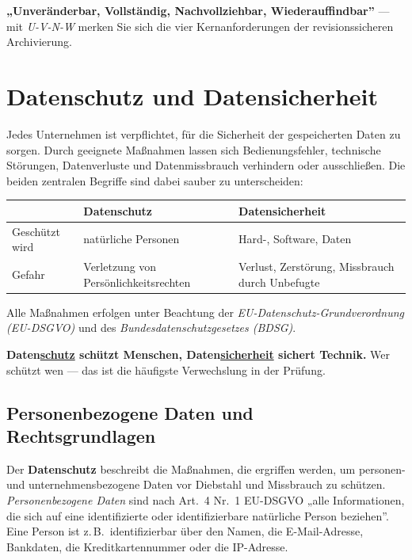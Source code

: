 \documentclass[11pt, a4paper]{article}
\begin{document}
\begin{eselsbruecke}
\textbf{„Unveränderbar, Vollständig, Nachvollziehbar, Wiederauffindbar”} --- mit
\emph{U-V-N-W} merken Sie sich die vier Kernanforderungen der revisionssicheren
Archivierung.
\end{eselsbruecke}

\section{Datenschutz und Datensicherheit}

Jedes Unternehmen ist verpflichtet, für die Sicherheit der gespeicherten Daten zu
sorgen. Durch geeignete Maßnahmen lassen sich Bedienungsfehler, technische Störungen,
Datenverluste und Datenmissbrauch verhindern oder ausschließen. Die beiden zentralen
Begriffe sind dabei sauber zu unterscheiden:

\begin{center}
\begin{tabular}{p{2.6cm} p{5.1cm} p{4.4cm}}
\toprule
 & \textbf{Datenschutz} & \textbf{Datensicherheit}\\
\midrule
Geschützt wird & natürliche Personen & Hard-, Software, Daten\\
Gefahr & Verletzung von Persönlichkeitsrechten & Verlust, Zerstörung, Missbrauch durch Unbefugte\\
\bottomrule
\end{tabular}
\end{center}

\medskip
Alle Maßnahmen erfolgen unter Beachtung der \emph{EU-Datenschutz-Grundverordnung
(EU-DSGVO)} und des \emph{Bundesdatenschutzgesetzes (BDSG)}.

\begin{eselsbruecke}
\textbf{Daten\underline{schutz} schützt Menschen, Daten\underline{sicherheit} sichert
Technik.} Wer schützt wen --- das ist die häufigste Verwechslung in der Prüfung.
\end{eselsbruecke}

\subsection{Personenbezogene Daten und Rechtsgrundlagen}

Der \textbf{Datenschutz} beschreibt die Maßnahmen, die ergriffen werden, um personen-
und unternehmensbezogene Daten vor Diebstahl und Missbrauch zu schützen.
\emph{Personenbezogene Daten} sind nach Art.~4 Nr.~1 EU-DSGVO „alle Informationen, die
sich auf eine identifizierte oder identifizierbare natürliche Person beziehen”. Eine
Person ist z.\,B.\ identifizierbar über den Namen, die E-Mail-Adresse, Bankdaten, die
Kreditkartennummer oder die IP-Adresse.
\end{document}
